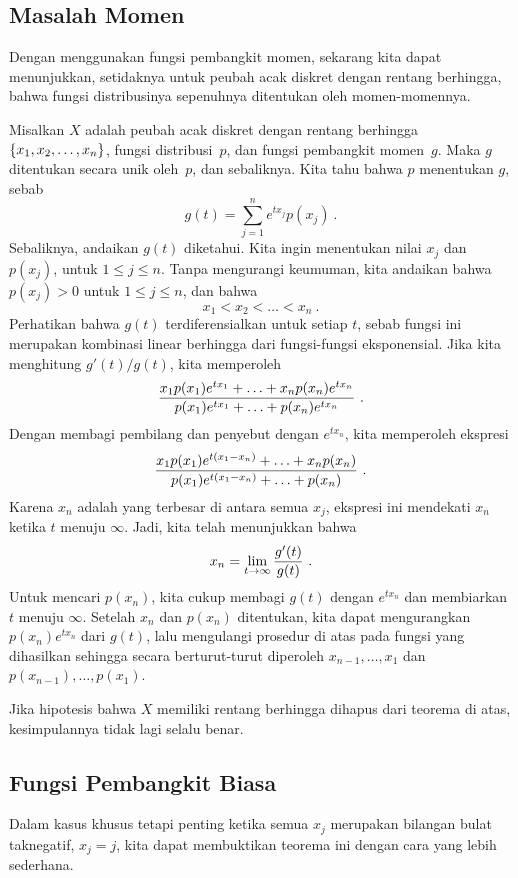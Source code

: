 \subsection*{Masalah Momen}
Dengan menggunakan fungsi pembangkit momen, sekarang kita dapat menunjukkan, setidaknya untuk
peubah acak diskret dengan rentang berhingga, bahwa fungsi distribusinya
sepenuhnya ditentukan oleh momen-momennya.
\begin{theorem}\label{thm 10.2}
Misalkan $X$ adalah peubah acak diskret dengan rentang berhingga 
$\{x_1,x_2,\ldots,\linebreak x_n\}$, fungsi distribusi~$p$, dan fungsi pembangkit
momen~$g$.  Maka $g$ ditentukan secara unik oleh~$p$, dan sebaliknya.
\proof
Kita tahu bahwa $p$ menentukan $g$, sebab
$$
g(t) = \sum_{j = 1}^n e^{tx_j} p(x_j)\ .
$$
Sebaliknya, andaikan $g(t)$ diketahui.  Kita ingin menentukan nilai $x_j$ dan $p(x_j)$, untuk $1 \le j \le n$.  Tanpa mengurangi keumuman, kita andaikan bahwa $p(x_j) > 0$ untuk $1 \le j \le n$, dan bahwa 
$$x_1 < x_2 < \ldots < x_n\ .$$
Perhatikan bahwa $g(t)$ terdiferensialkan untuk setiap $t$, sebab fungsi ini merupakan kombinasi linear berhingga dari fungsi-fungsi eksponensial.  Jika kita menghitung $g'(t)/g(t)$, kita memperoleh
$${{x_1 p(x_1) e^{tx_1} + \ldots + x_n p(x_n) e^{t x_n}}\over{p(x_1) e^{tx_1} + \ldots + p(x_n)e^{tx_n}}}\ .$$
Dengan membagi pembilang dan penyebut dengan $e^{tx_n}$, kita memperoleh ekspresi
$${{x_1 p(x_1) e^{t(x_1-x_n)} + \ldots + x_n p(x_n)}\over{p(x_1) e^{t(x_1 - x_n)} + \ldots + p(x_n)}}\ .$$
Karena $x_n$ adalah yang terbesar di antara semua $x_j$, ekspresi ini mendekati $x_n$ ketika $t$ menuju $\infty$. Jadi, kita telah menunjukkan bahwa
$$x_n = \lim_{t \rightarrow \infty} {{g'(t)}\over{g(t)}}\ .$$
Untuk mencari $p(x_n)$, kita cukup membagi $g(t)$ dengan $e^{tx_n}$ dan membiarkan $t$ menuju $\infty$.
Setelah $x_n$ dan $p(x_n)$ ditentukan, kita dapat mengurangkan $p(x_n) e^{tx_n}$ dari $g(t)$, lalu mengulangi prosedur di atas pada fungsi yang dihasilkan sehingga secara berturut-turut diperoleh $x_{n-1}, \ldots, x_1$ dan $p(x_{n-1}), \ldots, p(x_1)$.
\end{theorem}

Jika hipotesis bahwa $X$ memiliki rentang berhingga dihapus dari teorema di atas,
kesimpulannya tidak lagi selalu benar.

\subsection*{Fungsi Pembangkit Biasa}
Dalam kasus khusus tetapi penting ketika semua $x_j$ merupakan bilangan bulat taknegatif,
$x_j = j$, kita dapat membuktikan teorema ini dengan cara yang lebih sederhana.

